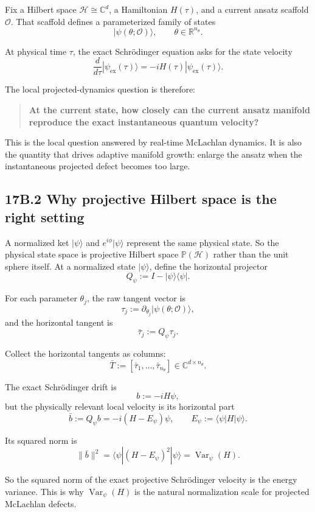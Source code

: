 \documentclass[11pt]{article}
\begin{document}
Fix a Hilbert space $\mathcal H\cong\mathbb C^d$, a Hamiltonian $H(\tau)$, and a current ansatz scaffold $\mathcal O$. That scaffold defines a parameterized family of states
\[
|\psi(\theta;\mathcal O)\rangle,
\qquad
\theta\in\mathbb R^{n_\theta}.
\]

At physical time $\tau$, the exact Schrödinger equation asks for the state velocity
\[
\frac{d}{d\tau}|\psi_{\mathrm{ex}}(\tau)\rangle
=
-iH(\tau)|\psi_{\mathrm{ex}}(\tau)\rangle.
\]

The local projected-dynamics question is therefore:

\begin{quote}
\textbf{At the current state, how closely can the current ansatz manifold reproduce the exact instantaneous quantum velocity?}
\end{quote}


This is the local question answered by real-time McLachlan dynamics. It is also the quantity that drives adaptive manifold growth: enlarge the ansatz when the instantaneous projected defect becomes too large.

\subsection*{17B.2 Why projective Hilbert space is the right setting}


A normalized ket $|\psi\rangle$ and $e^{i\phi}|\psi\rangle$ represent the same physical state. So the physical state space is projective Hilbert space $\mathbb P(\mathcal H)$ rather than the unit sphere itself. At a normalized state $|\psi\rangle$, define the horizontal projector
\[
Q_\psi:=I-|\psi\rangle\langle\psi|.
\]

For each parameter $\theta_j$, the raw tangent vector is
\[
\tau_j:=\partial_{\theta_j}|\psi(\theta;\mathcal O)\rangle,
\]
and the horizontal tangent is
\[
\bar\tau_j:=Q_\psi\tau_j.
\]

Collect the horizontal tangents as columns:
\[
\bar T:=[\bar\tau_1,\dots,\bar\tau_{n_\theta}]\in\mathbb C^{d\times n_\theta}.
\]

The exact Schrödinger drift is
\[
b:=-iH\psi,
\]
but the physically relevant local velocity is its horizontal part
\[
\bar b:=Q_\psi b
=
-i(H-E_\psi)\psi,
\qquad
E_\psi:=\langle\psi|H|\psi\rangle.
\]

Its squared norm is
\[
\|\bar b\|^2
=
\langle\psi|(H-E_\psi)^2|\psi\rangle
=
\operatorname{Var}_\psi(H).
\]

So the squared norm of the exact projective Schrödinger velocity is the energy variance. This is why $\operatorname{Var}_\psi(H)$ is the natural normalization scale for projected McLachlan defects.
\end{document}
